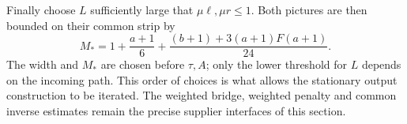 Finally choose $L$ sufficiently large that $\mu\ell,\mu r\leq1$.
Both pictures are then bounded on their common strip by
\[
 M_*=1+\frac{a+1}{6}
          +\frac{(b+1)+3(a+1)F(a+1)}{24}.
\]
The width and $M_*$ are chosen before $\tau,A$; only the lower threshold
for $L$ depends on the incoming path. This order of choices is what
allows the stationary output construction to be iterated.
The weighted bridge, weighted penalty and common inverse estimates
remain the precise supplier interfaces of this section.
